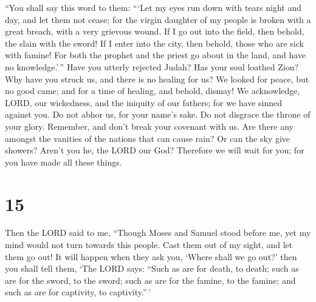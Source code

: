  ``You shall say this word to them: ```Let my eyes run down
with tears night and day, and let them not cease; for the virgin
daughter of my people is broken with a great breach, with a very
grievous wound.  If I go out into the field, then behold,
the slain with the sword! If I enter into the city, then behold, those
who are sick with famine! For both the prophet and the priest go about
in the land, and have no knowledge.'\,''  Have you utterly
rejected Judah? Has your soul loathed Zion? Why have you struck us, and
there is no healing for us? We looked for peace, but no good came; and
for a time of healing, and behold, dismay!  We acknowledge,
LORD, our wickedness, and the iniquity of our fathers; for we have
sinned against you.  Do not abhor us, for your name's sake.
Do not disgrace the throne of your glory. Remember, and don't break your
covenant with us.  Are there any amongst the vanities of
the nations that can cause rain? Or can the sky give showers? Aren't you
he, the LORD our God? Therefore we will wait for you; for you have made
all these things.

\hypertarget{section-14}{%
\section{15}\label{section-14}}

 Then the LORD said to me, ``Though Moses and Samuel stood
before me, yet my mind would not turn towards this people. Cast them out
of my sight, and let them go out!  It will happen when they
ask you, `Where shall we go out?' then you shall tell them, `The LORD
says: ``Such as are for death, to death; such as are for the sword, to
the sword; such as are for the famine, to the famine; and such as are
for captivity, to captivity.''\,'


